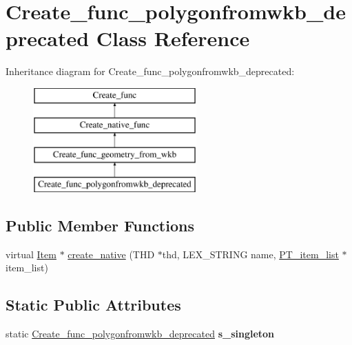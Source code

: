 \hypertarget{classCreate__func__polygonfromwkb__deprecated}{}\section{Create\+\_\+func\+\_\+polygonfromwkb\+\_\+deprecated Class Reference}
\label{classCreate__func__polygonfromwkb__deprecated}
Inheritance diagram for Create\+\_\+func\+\_\+polygonfromwkb\+\_\+deprecated\+:\begin{figure}[H]
\begin{center}
\leavevmode
\includegraphics[height=4.000000cm]{classCreate__func__polygonfromwkb__deprecated}
\end{center}
\end{figure}
\subsection*{Public Member Functions}
\begin{DoxyCompactItemize}
\item 
virtual \mbox{\hyperlink{classItem}{Item}} $\ast$ \mbox{\hyperlink{classCreate__func__polygonfromwkb__deprecated_a5eec1c4da2bfbb22a7804ea5a000badd}{create\+\_\+native}} (T\+HD $\ast$thd, L\+E\+X\+\_\+\+S\+T\+R\+I\+NG name, \mbox{\hyperlink{classPT__item__list}{P\+T\+\_\+item\+\_\+list}} $\ast$item\+\_\+list)
\end{DoxyCompactItemize}
\subsection*{Static Public Attributes}
\begin{DoxyCompactItemize}
\item 
\mbox{\label{classCreate__func__polygonfromwkb__deprecated_a4b5a4bc16de4457a698676210bc01946}} 
static \mbox{\hyperlink{classCreate__func__polygonfromwkb__deprecated}{Create\+\_\+func\+\_\+polygonfromwkb\+\_\+deprecated}} {\bfseries s\+\_\+singleton}
\end{DoxyCompactItemize}
